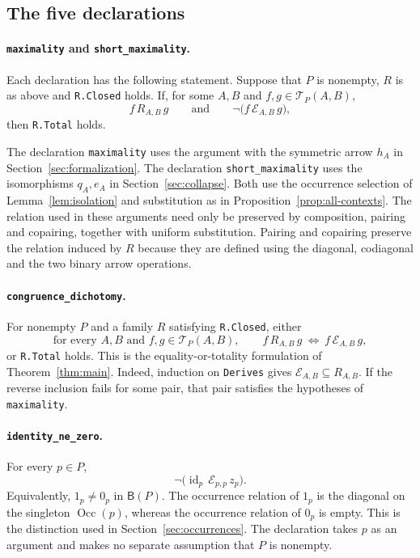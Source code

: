 \documentclass[11pt]{article}
\newcommand{\B}{\mathsf B}
\newcommand{\Occ}{\operatorname{Occ}}
\begin{document}
\subsection{The five declarations}

\paragraph{\texttt{maximality} and \texttt{short\_maximality}.}
Each declaration has the following statement. Suppose that $P$ is
nonempty, $R$ is as above and \texttt{R.Closed} holds. If, for some
$A,B$ and $f,g\in\mathcal T_P(A,B)$,
\[
 f\,R_{A,B}\,g
 \qquad\text{and}\qquad
 \neg\bigl(f\,\mathcal E_{A,B}\,g\bigr),
\]
then \texttt{R.Total} holds.

The declaration \texttt{maximality} uses the argument with the
symmetric arrow $h_A$ in Section~\ref{sec:formalization}.
The declaration \texttt{short\_maximality} uses the isomorphisms
$q_A,e_A$ in Section~\ref{sec:collapse}.
Both use the occurrence selection of Lemma~\ref{lem:isolation}
and substitution as in Proposition~\ref{prop:all-contexts}.
The relation used in these arguments need only be preserved by
composition, pairing and copairing, together with uniform substitution.
Pairing and copairing preserve the relation induced by $R$ because
they are defined using the diagonal, codiagonal and the two binary
arrow operations.

\paragraph{\texttt{congruence\_dichotomy}.}
For nonempty $P$ and a family $R$ satisfying \texttt{R.Closed},
either
\[
 \text{for every }A,B\text{ and }f,g\in\mathcal T_P(A,B),\qquad
 f\,R_{A,B}\,g\ \Longleftrightarrow\ f\,\mathcal E_{A,B}\,g,
\]
or \texttt{R.Total} holds. This is the equality-or-totality formulation
of Theorem~\ref{thm:main}.
Indeed, induction on \texttt{Derives} gives $\mathcal E_{A,B}\subseteq
R_{A,B}$. If the reverse inclusion fails for some pair, that pair
satisfies the hypotheses of \texttt{maximality}.

\paragraph{\texttt{identity\_ne\_zero}.}
For every $p\in P$,
\[
 \neg\bigl(\operatorname{id}_p\,\mathcal E_{p,p}\,z_p\bigr).
\]
Equivalently, $1_p\ne0_p$ in $\B(P)$.
The occurrence relation of $1_p$ is the diagonal on the singleton
$\Occ(p)$, whereas the occurrence relation of $0_p$ is empty.
This is the distinction used in Section~\ref{sec:occurrences}.
The declaration takes $p$ as an argument and makes no separate
assumption that $P$ is nonempty.
\end{document}
